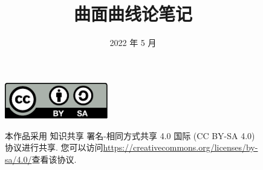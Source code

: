 \documentclass[11pt]{aklbook}
\title{曲面曲线论笔记}
\affil{北京师范大学数学科学学院}
\date{2022 年 5 月}
\numberwithin{equation}{section}
\begin{document}
    \maketitle
    \vspace*{15cm}
    \thispagestyle{empty}
    \begin{figure}[ht]
        \includegraphics[width=0.4\textwidth]{by-sa.pdf}\hspace{0.05\textwidth}\begin{minipage}[b]{0.55\textwidth}
        本作品采用 知识共享 署名-相同方式共享 4.0 国际 (CC BY-SA 4.0) 协议进行共享. 您可以访问\url{https://creativecommons.org/licenses/by-sa/4.0/}查看该协议.
        \end{minipage}
    \end{figure}

    \frontmatter
    

    \tableofcontents

    \mainmatter
    

    \appendix
    \printbibliography[title={参考文献},heading=bibintoc]
\end{document}
